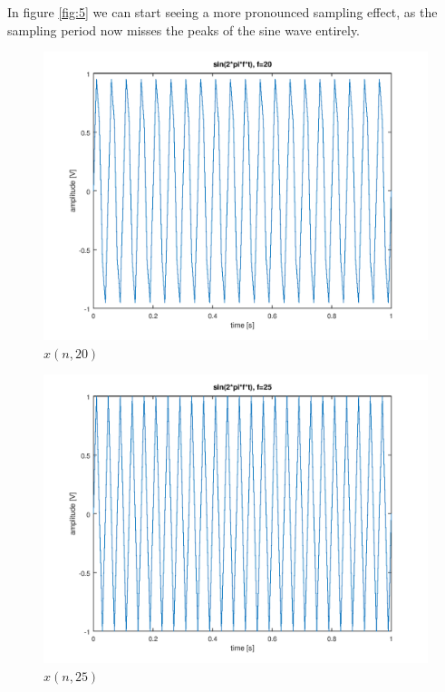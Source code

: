 \documentclass[a4paper, 12pt]{report}
\begin{document}
			In figure \ref{fig:5} we can start seeing a more pronounced sampling effect, as the sampling period now misses the peaks of the sine wave entirely.

			\begin{figure}[H]
				\label{fig:6}
				\includegraphics[width=\textwidth]{img/1_6.png}
				\caption{$x(n, 20)$}
			\end{figure}

			\begin{figure}[H]
				\label{fig:7}
				\includegraphics[width=\textwidth]{img/1_7.png}
				\caption{$x(n, 25)$}
			\end{figure}
\end{document}
